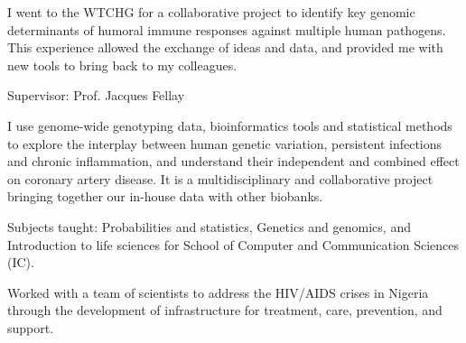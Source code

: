 \documentclass[10pt, a4paper, normalphoto]{altacv}
\begin{document}


\begin{fullwidth}
\makecvheader
\end{fullwidth}



I went to the WTCHG for a collaborative project to identify key genomic determinants of humoral immune responses against multiple human pathogens. This experience allowed the exchange of ideas and data, and provided me with new tools to bring back to my colleagues.

\divider

Supervisor: Prof. Jacques Fellay \smallskip

I use genome-wide genotyping data, bioinformatics tools and statistical methods to explore the interplay between human genetic variation, persistent infections and chronic inflammation, and understand their independent and combined effect on coronary artery disease. It is a multidisciplinary and collaborative project bringing together our in-house data with other biobanks.  

\divider

Subjects taught: Probabilities and statistics, Genetics and genomics, and Introduction to life sciences for School of Computer and Communication Sciences (IC).

\divider

Worked with a team of scientists to address the HIV/AIDS crises in Nigeria through the development of infrastructure for treatment, care, prevention, and support.
\end{document}

